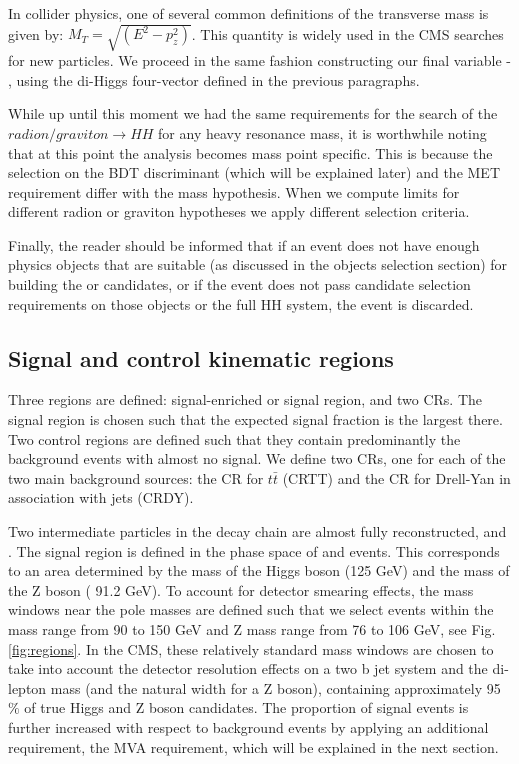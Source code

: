 In collider physics, one of several common definitions of the transverse mass is given by: $M_T=\sqrt{( E^2- p_z^2)}$. This quantity is widely used in the CMS searches for new particles. We proceed in the same fashion constructing our final variable - \mTHH, using the di-Higgs four-vector defined in the previous paragraphs. 

While up until this moment we had the same requirements for the search of the $radion/graviton \to HH$ for any heavy resonance mass, it is worthwhile noting that at this point the analysis becomes mass point specific. This is because the selection on the BDT discriminant (which will be explained later) and the MET requirement differ with the mass hypothesis. When we compute limits for different radion or graviton hypotheses we apply different selection criteria. 

Finally, the reader should be informed that if an event does not have enough physics objects that are suitable (as discussed in the objects selection section) for building the \Zll or \HBB candidates, or if the event does not pass candidate selection requirements on those objects or the full HH system, the event is discarded.

\subsection{Signal and control kinematic regions}

Three regions are defined: signal-enriched or signal region, and two CRs. The signal region is chosen such that the expected signal fraction is the largest there. Two control regions are defined such that they contain predominantly the background events with almost no signal. We define two CRs, one for each of the two main background sources: the CR for $t\bar{t}$ (CRTT) and the CR for Drell-Yan in association with jets (CRDY).

Two intermediate particles in the decay chain are almost fully reconstructed, \HBB and \Zll. The signal region is defined in the phase space of \HBB and \Zll events. This corresponds to an area determined by the mass of the Higgs boson (125 GeV) and the mass of the Z boson ( 91.2 GeV). To account for detector smearing effects, the mass windows near the pole masses are defined such that we select events within the \HBB mass range from 90 to 150 GeV and Z mass range from 76 to 106 GeV, see Fig. \ref{fig:regions}. In the CMS, these relatively standard mass windows are chosen to take into account the detector resolution effects on a two b jet system and the di-lepton mass (and the natural width for a Z boson), containing approximately 95$\%$ of true Higgs and Z boson candidates. The proportion of signal events is further increased with respect to background events by applying an additional requirement, the MVA requirement, which will be explained in the next section.

